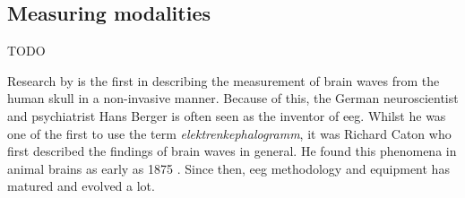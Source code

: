 
\subsection{Measuring modalities}
\label{subsec:biomedical_signals_measuring_modalities}






TODO

Research by \citet{human_eeg_discovery} is the first in describing the measurement of brain waves from the human skull in a non-invasive manner.
Because of this, the German neuroscientist and psychiatrist Hans Berger is often seen as the inventor of \gls{eeg}.
Whilst he was one of the first to use the term \textit{elektrenkephalogramm}, it was Richard Caton who first described the findings of brain waves in general.
He found this phenomena in animal brains as early as 1875 \citep{first_eeg}.
Since then, \gls{eeg} methodology and equipment has matured and evolved a lot.


